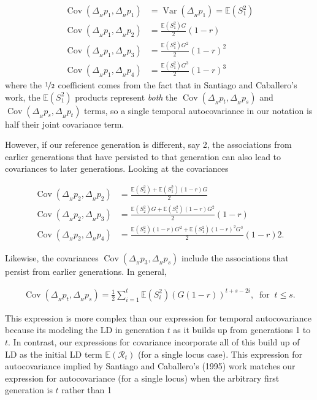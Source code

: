 \documentclass[11pt]{article}
\newcommand{\E}{\mathbb{E}}
\DeclareMathOperator{\var}{Var}
\DeclareMathOperator{\cov}{Cov}
\begin{document}
\begin{align}
  \cov(\Delta_{_H} p_1, \Delta_{_H} p_1) &= \var(\Delta_{_H} p_1) = \E(S_1^2) \\
  \cov(\Delta_{_H} p_1, \Delta_{_H} p_2) &= \frac{\E(S_1^2) G}{2} (1-r) \\
  \cov(\Delta_{_H} p_1, \Delta_{_H} p_3) &= \frac{\E(S_1^2) G^2 }{2}(1-r)^2\\
  \cov(\Delta_{_H} p_1, \Delta_{_H} p_4) &= \frac{\E(S_1^2) G^3 }{2} (1-r)^3
\end{align}
%
where the $\nicefrac{1}{2}$ coefficient comes from the fact that in Santiago
and Caballero's work, the $\E(S_1^2)$ products represent \emph{both} the
$\cov(\Delta_{_H} p_t, \Delta_{_H} p_s)$ and $\cov(\Delta_{_H} p_s, \Delta_{_H}
p_t)$ terms, so a single temporal autocovariance in our notation is half 
their joint covariance term.

However, if our reference generation is different, say 2, the associations from
earlier generations that have persisted to that generation can also lead to
covariances to later generations. Looking at the covariances 

\begin{align}
  \cov(\Delta_{_H} p_2, \Delta_{_H} p_2) &= \frac{\E(S_2^2) + \E(S_1^2) (1-r) G}{2} \\
  \cov(\Delta_{_H} p_2, \Delta_{_H} p_3) &= \frac{\E(S_2^2) G  + \E(S_1^2) (1-r) G^2}{2} (1-r) \\
  \cov(\Delta_{_H} p_2, \Delta_{_H} p_4) &= \frac{\E(S_2^2) (1-r) G^2 + \E(S_1^2) (1-r)^2 G^3}{2} (1-r)2.
\end{align}

Likewise, the covariances $\cov(\Delta_{_H} p_3, \Delta_{_H} p_s)$ include the
associations that persist from earlier generations. In general, 

\begin{align}
  \cov(\Delta_{_H} p_t, \Delta_{_H} p_s) = \frac{1}{2}\sum_{i=1}^{t} \E(S_i^2) \left(G (1-r)\right)^{t + s - 2i}, \; \; \text{for} \; \; t \le s.
  \label{eq:sc-cov}
\end{align}

This expression is more complex than our expression for temporal autocovariance
because its modeling the LD in generation $t$ as it builds up from generations
1 to $t$. In contrast, our expressions for covariance incorporate all of this
build up of LD as the initial LD term $\E(\mathcal{R}_t)$ (for a single locus case). This
expression for autocovariance implied by Santiago and Caballero's (1995) work
matches our expression for autocovariance (for a single locus) when the
arbitrary first generation is $t$ rather than 1
\end{document}
